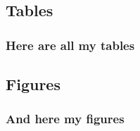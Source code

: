 \subsection{Tables}

\subsubsection{Here are all my tables}
%

\pagebreak

\subsection{Figures}


\subsubsection{And here my figures}
%



\pagebreak